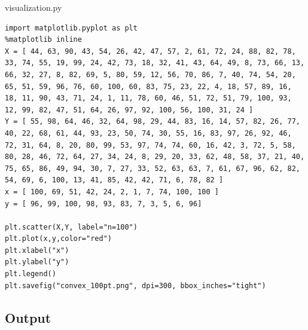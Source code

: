\begin{code}
    \caption{visualization.py}
    \begin{verbatim}
import matplotlib.pyplot as plt 
%matplotlib inline
X = [ 44, 63, 90, 43, 54, 26, 42, 47, 57, 2, 61, 72, 24, 88, 82, 78, 33, 74, 55, 19, 99, 24, 42, 73, 18, 32, 41, 43, 64, 49, 8, 73, 66, 13, 66, 32, 27, 8, 82, 69, 5, 80, 59, 12, 56, 70, 86, 7, 40, 74, 54, 20, 65, 51, 59, 96, 76, 60, 100, 60, 83, 75, 23, 22, 4, 18, 57, 89, 16, 18, 11, 90, 43, 71, 24, 1, 11, 78, 60, 46, 51, 72, 51, 79, 100, 93, 12, 99, 82, 47, 51, 64, 26, 97, 92, 100, 56, 100, 31, 24 ]
Y = [ 55, 98, 64, 46, 32, 64, 98, 29, 44, 83, 16, 14, 57, 82, 26, 77, 40, 22, 68, 61, 44, 93, 23, 50, 74, 30, 55, 16, 83, 97, 26, 92, 46, 72, 31, 64, 8, 20, 80, 99, 53, 97, 74, 74, 60, 16, 42, 3, 72, 5, 58, 80, 28, 46, 72, 64, 27, 34, 24, 8, 29, 20, 33, 62, 48, 58, 37, 21, 40, 75, 65, 86, 49, 94, 30, 7, 27, 33, 52, 63, 63, 7, 61, 67, 96, 62, 82, 54, 69, 6, 100, 13, 41, 85, 42, 42, 71, 6, 78, 82 ]
x = [ 100, 69, 51, 42, 24, 2, 1, 7, 74, 100, 100 ]
y = [ 96, 99, 100, 98, 93, 83, 7, 3, 5, 6, 96]

plt.scatter(X,Y, label="n=100")
plt.plot(x,y,color="red")
plt.xlabel("x") 
plt.ylabel("y")
plt.legend()
plt.savefig("convex_100pt.png", dpi=300, bbox_inches="tight")
    \end{verbatim}
\end{code}

\subsection{Output}

